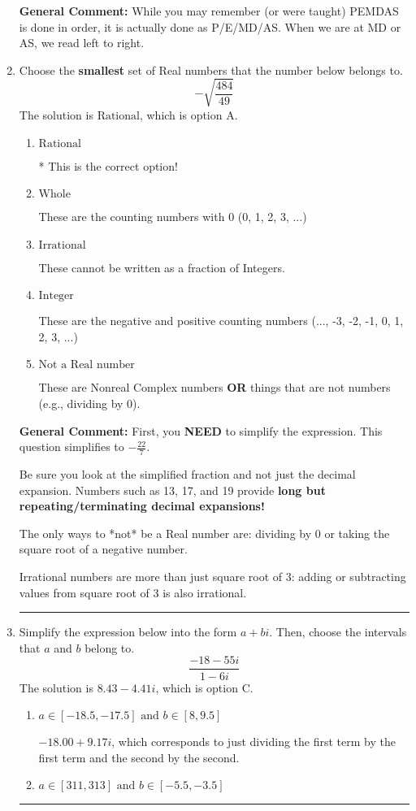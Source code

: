 \documentclass{extbook}[14pt]
\newcommand{\litem}[1]{\item #1

\rule{\textwidth}{0.4pt}}
\begin{document}
\begin{enumerate}
{\textbf{General Comment:} While you may remember (or were taught) PEMDAS is done in order, it is actually done as P/E/MD/AS. When we are at MD or AS, we read left to right.
}
\litem{
Choose the \textbf{smallest} set of Real numbers that the number below belongs to.
\[ -\sqrt{\frac{484}{49}} \]The solution is \( \text{Rational} \), which is option A.\begin{enumerate}[label=\Alph*.]
\item \( \text{Rational} \)

* This is the correct option!
\item \( \text{Whole} \)

These are the counting numbers with 0 (0, 1, 2, 3, ...)
\item \( \text{Irrational} \)

These cannot be written as a fraction of Integers.
\item \( \text{Integer} \)

These are the negative and positive counting numbers (..., -3, -2, -1, 0, 1, 2, 3, ...)
\item \( \text{Not a Real number} \)

These are Nonreal Complex numbers \textbf{OR} things that are not numbers (e.g., dividing by 0).
\end{enumerate}

\textbf{General Comment:} First, you \textbf{NEED} to simplify the expression. This question simplifies to $-\frac{22}{7}$. 
 
 Be sure you look at the simplified fraction and not just the decimal expansion. Numbers such as 13, 17, and 19 provide \textbf{long but repeating/terminating decimal expansions!} 
 
 The only ways to *not* be a Real number are: dividing by 0 or taking the square root of a negative number. 
 
 Irrational numbers are more than just square root of 3: adding or subtracting values from square root of 3 is also irrational.
}
\litem{
Simplify the expression below into the form $a+bi$. Then, choose the intervals that $a$ and $b$ belong to.
\[ \frac{-18 - 55 i}{1 - 6 i} \]The solution is \( 8.43  - 4.41 i \), which is option C.\begin{enumerate}[label=\Alph*.]
\item \( a \in [-18.5, -17.5] \text{ and } b \in [8, 9.5] \)

 $-18.00  + 9.17 i$, which corresponds to just dividing the first term by the first term and the second by the second.
\item \( a \in [311, 313] \text{ and } b \in [-5.5, -3.5] \)


\end{enumerate}}
\end{enumerate}
\end{document}
